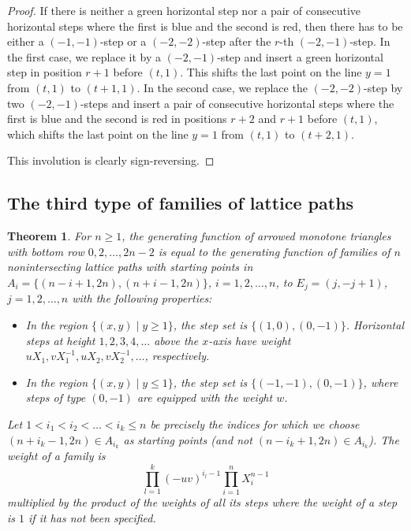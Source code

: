 \documentclass[12pt]{amsart}
\newtheorem{theorem}{Theorem}[section]
\theoremstyle{definition}
\numberwithin{equation}{section}
\begin{document}
\begin{proof}
	If there is neither a green horizontal step nor a pair of consecutive horizontal steps where the first is blue and the second is red, then there has to be either a $(-1,-1)$-step or a $(-2,-2)$-step after the $r$-th 
	$(-2,-1)$-step. In the first case, we replace it by a $(-2,-1)$-step and insert a green horizontal step in 
	position $r+1$ before $(t,1)$. This shifts the last point on the line $y=1$ from $(t,1)$ to $(t+1,1)$. In the second case, we replace the $(-2,-2)$-step by two $(-2,-1)$-steps and insert a pair of consecutive horizontal steps where the first is blue and the second is red in positions $r+2$ and $r+1$ before $(t,1)$, which shifts the last point on the line $y=1$ from $(t,1)$ to $(t+2,1)$.
	
	This involution is clearly sign-reversing.\qedhere
	
\end{proof} 

\subsection{The third type of families of lattice paths} 
\label{third}

\begin{theorem} 
	\label{interpret3} 
	For $n \ge 1$, the generating function of arrowed monotone triangles with bottom row 
	$0,2,\ldots,2n-2$ is equal to the generating function of families of $n$ nonintersecting lattice paths with starting points in $A_i=\{(n-i+1,2n),(n+i-1,2n)\}$, $i=1,2,\ldots,n$, to $E_j=(j,-j+1)$, $j=1,2,\ldots,n$ with the following properties:
	\begin{itemize}
		\item  In the region $\{(x,y) \mid y \ge 1\}$, the step set is $\{(1,0),(0,-1)\}$. Horizontal steps at height $1,2,3,4,\ldots$ above the $x$-axis have weight 
		$u X_1, v X_1^{-1}, u X_2, v X_2^{-1},\ldots$, respectively.
		\item In the region $\{(x,y) \mid y \le 1\}$, the step set is $\{(-1,-1),(0,-1)\}$, where steps of type $(0,-1)$ are equipped with the weight $w$.
	\end{itemize} 
	Let $1 < i_1 < i_2 < \ldots < i_k \le n$ be precisely the indices for which we choose 
	$(n+i_k-1,2n) \in A_{i_k}$ as starting points (and not $(n-i_k+1,2n) \in A_{i_k}$). 
	The weight of a family is 
	\begin{equation*}
		\prod_{l=1}^k (-uv)^{i_l-1}  \prod_{i=1}^n X_i^{n-1}
	\end{equation*}
	multiplied by the product of the weights of all its steps where the 
	weight of a step is $1$ if it has not been specified. 
\end{theorem}
\end{document}
